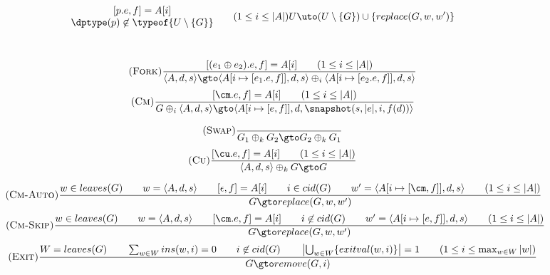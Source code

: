 \begin{figure*}
\begin{minipage}{\textwidth}
\[{{\begin{matrix}
{\begin{matrix}
                [p.e,f] = A[i] \\
                \dptype(p)\not\in\typeof{U\setminus\{G\}}
              \end{matrix}}
              \qquad
              (1\le i\le |A|)
            \end{matrix}}}
    {U \uto (U\setminus\{G\}) \cup \{replace(G,w,w')\}}
  \]
%
  \flushright{}\\
  \begin{minipage}{0.59\textwidth}
  \[
    \tag{\sc Fork}\label{rule:fork}
    \frac{
    {[(e_1\oplus e_2).e,f]=A[i]}\qquad
    {(1\le i\le |A|)}}
    {\langle A,d,s\rangle \gto
      \langle A[i\mapsto[e_1.e,f]],d,s\rangle \oplus_i
      \langle A[i\mapsto[e_2.e,f]],d,s\rangle}
  \]
  \[
    \tag{\sc Cm}\label{rule:cm}
    \frac{
    {[\cm.e,f]=A[i]}\qquad
    {(1\le i\le |A|)}}
    {G\oplus_i\langle A,d,s\rangle \gto \langle A[i\mapsto[e,f]],d,\snapshot(s,|e|,i,f(d))\rangle}
  \]
  \end{minipage}
  \begin{minipage}{0.4\textwidth}
  \[
    \tag{\sc Swap}\label{rule:swap}
    \frac{}{G_1\oplus_k G_2 \gto G_2\oplus_k G_1}
  \]
  \[
    \tag{\sc Cu}\label{rule:cu}
    \frac{
    {[\cu.e,f]=A[i]}\qquad
    {(1\le i\le |A|)}}
    {\langle A,d,s\rangle\oplus_k G \gto G}
  \]
  \end{minipage}
  \vspace{1ex}
  \[
    \tag{\sc Cm-Auto}\label{rule:cm-auto}
    \frac{
      w\in leaves(G) \qquad
      w=\langle A,d,s\rangle \qquad
      [\epsilon,f]=A[i] \qquad
      i\in cid(G) \qquad
      w'=\langle A[i\mapsto[\cm,f]],d,s\rangle \qquad
      (1\le i\le |A|)
    }
    {G \gto replace(G,w,w')}
  \]
  \[
    \tag{\sc Cm-Skip}\label{rule:cm-skip}
    \frac{
      w\in leaves(G) \qquad
      w=\langle A,d,s\rangle \qquad
      [\cm.e,f]=A[i] \qquad
      i\not\in cid(G) \qquad
      w'=\langle A[i\mapsto[e,f]],d,s\rangle \qquad
      (1\le i\le |A|)
    }
    {G \gto replace(G,w,w')}
  \]
  \vspace{1ex}
  \[
    \tag{\sc Exit}\label{rule:exit}
    \frac{%
    W=leaves(G)
    \qquad \sum_{w\in W} ins(w,i)=0
    \qquad i\not\in cid(G)
    \qquad \left|\bigcup_{w\in W} \{exitval(w,i)\}\right|=1
    \qquad (1\le i\le\max_{w\in W} |w|)}
    {G \gto remove(G,i)}
  \]
  \vspace{1mm}
\end{minipage}

\end{figure*}

